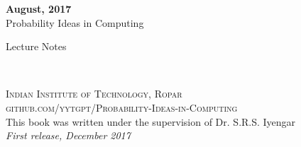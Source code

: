 \documentclass[11pt,fleqn]{book} %
\begin{document}

\begingroup
\thispagestyle{empty}
\centering
\vspace*{5cm}
\par\normalfont\fontsize{35}{35}\sffamily\selectfont
\textbf{August, 2017}\\
{\LARGE Probability Ideas in Computing}\par %
\vspace*{1cm}
{\Huge Lecture Notes}\par %
\endgroup


\newpage
~\vfill
\thispagestyle{empty}


\noindent \textsc{Indian Institute of Technology, Ropar}\\

\noindent \textsc{github.com/yytgpt/Probability-Ideas-in-Computing}\\ %

\noindent This book was written under the supervision of Dr. S.R.S. Iyengar \\ %

\noindent \textit{First release, December 2017} %



\pagestyle{empty} %

\tableofcontents %


\pagestyle{fancy} %
\end{document}
